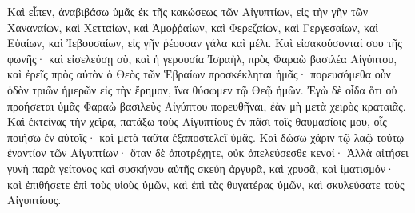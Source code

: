 {Καὶ εἶπεν, ἀναβιβάσω ὑμᾶς ἐκ τῆς κακώσεως τῶν Αἰγυπτίων, εἰς τὴν γῆν τῶν Χαναναίων, καὶ Χετταίων, καὶ Ἀμοῤῥαίων, καὶ Φερεζαίων, καὶ Γεργεσαίων, καὶ Εὑαίων, καὶ Ἰεβουσαίων, εἰς γῆν ῥέουσαν γάλα καὶ μέλι.
Καὶ εἰσακούσονταί σου τῆς φωνῆς· καὶ εἰσελεύσῃ σὺ, καὶ ἡ γερουσία Ἰσραὴλ, πρὸς Φαραὼ βασιλέα Αἰγύπτου, καὶ ἐρεῖς πρὸς αὐτὸν ὁ Θεὸς τῶν Ἑβραίων προσκέκληται ἡμᾶς· πορευσόμεθα οὖν ὁδὸν τριῶν ἡμερῶν εἰς τὴν ἔρημον, ἵνα θύσωμεν τῷ Θεῷ ἡμῶν.
Ἐγὼ δὲ οἶδα ὅτι οὐ προήσεται ὑμᾶς Φαραὼ βασιλεὺς Αἰγύπτου πορευθῆναι, ἐὰν μὴ μετὰ χειρὸς κραταιᾶς.
Καὶ ἐκτείνας τὴν χεῖρα, πατάξω τοὺς Αἰγυπτίους ἐν πᾶσι τοῖς θαυμασίοις μου, οἷς ποιήσω ἐν αὐτοῖς· καὶ μετὰ ταῦτα ἐξαποστελεῖ ὑμᾶς.
Καὶ δώσω χάριν τῷ λαῷ τούτῳ ἐναντίον τῶν Αἰγυπτίων· ὅταν δὲ ἀποτρέχητε, οὐκ ἀπελεύσεσθε κενοί·
Ἀλλὰ αἰτήσει γυνὴ παρὰ γείτονος καὶ συσκήνου αὐτῆς σκεύη ἀργυρᾶ, καὶ χρυσᾶ, καὶ ἱματισμόν· καὶ ἐπιθήσετε ἐπὶ τοὺς υἱοὺς ὑμῶν, καὶ ἐπὶ τὰς θυγατέρας ὑμῶν, καὶ σκυλεύσατε τοὺς Αἰγυπτίους.

}
